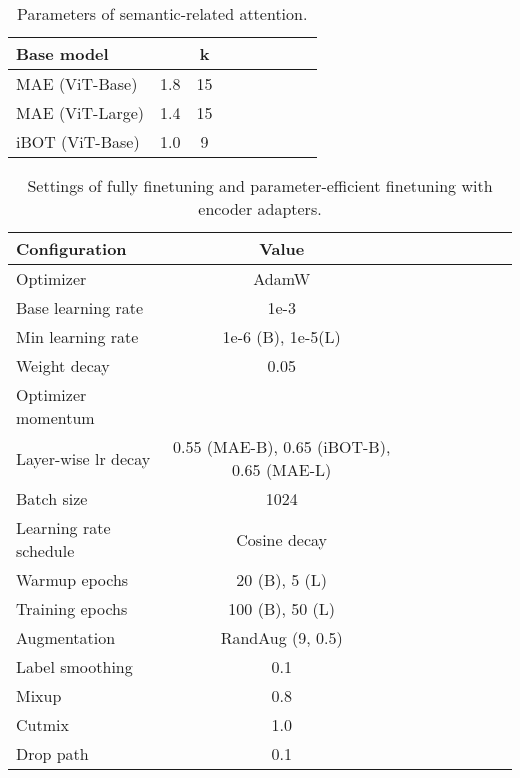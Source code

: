 \documentclass{article} \usepackage{iclr2023_conference,times}
\begin{document}
\begin{table}[]
	\centering
	\setlength{\tabcolsep}{10mm}
	\caption{Parameters of semantic-related attention.
	}
	\small
	\begin{tabular}{lcccccccc}
		\toprule
        Base model       & & k \\	\midrule
        MAE (ViT-Base) & 1.8 & 15  \\
        MAE (ViT-Large) & 1.4 & 15  \\
        iBOT (ViT-Base) & 1.0 & 9  \\
		\bottomrule
	\end{tabular}
	\label{tab:sem_att_weights}
	\vspace{-15pt}
\end{table}
\begin{table}[]
	\centering
	\setlength{\tabcolsep}{8mm}
	\caption{Settings of fully finetuning and parameter-efficient finetuning with encoder adapters.
	}
	\small
	\begin{tabular}{lcccccccc}
		\toprule
        Configuration      & Value \\	\midrule
        Optimizer & AdamW \\
        Base learning rate & 1e-3 \\
        Min learning rate & 1e-6 (B), 1e-5(L)  \\
        Weight decay & 0.05 \\
        Optimizer momentum &  \\
        Layer-wise lr decay  & 0.55 (MAE-B), 0.65 (iBOT-B), 0.65 (MAE-L)  \\
        Batch size & 1024 \\
        Learning rate schedule & Cosine decay \\
        Warmup epochs & 20 (B), 5 (L) \\
        Training epochs & 100 (B), 50 (L) \\
        Augmentation & RandAug (9, 0.5)  \\
        Label smoothing & 0.1 \\
        Mixup  & 0.8 \\
        Cutmix  & 1.0 \\
        Drop path  & 0.1 \\
		\bottomrule
	\end{tabular}
	\label{tab:finetune}
\end{table}
\end{document}

